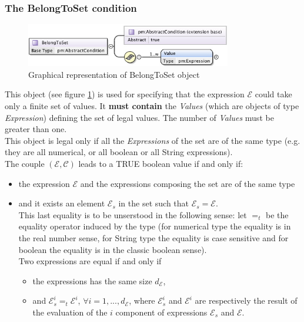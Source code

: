 \documentclass[a4paper,11pt] {article}
\begin{document}
\subsubsection{The BelongToSet condition}\label{par-BelongToSet}
\begin{figure}[htbp]
\begin{center}
\includegraphics[width=0.8\textwidth]{pictures/BelongToSet.jpg} 
\caption{Graphical representation of BelongToSet object}
\label{Pic-BelongToSet}
\end{center}
\end{figure}
This object (see figure \ref{Pic-BelongToSet}) is used for specifying that the expression $\mathcal
E$ could take only a finite set of values.
It {\bf must contain} the {\it Values} (which are objects of type {\it Expression}) defining the set
of legal values. The number of {\it Values} must be greater than one.\\
This object is legal only if all the {\it Expressions} of the set are of the same type (e.g. they
are all numerical, or all boolean or all String expressions).\\
The couple $(\mathcal E, \mathcal C)$ leads to a TRUE boolean value if and only if:
\begin{itemize}
\item the expression $\mathcal E$ and the expressions composing the set are of the same type
\item and it exists an element $\mathcal E_s$ in the set such that $\mathcal E_s = \mathcal E$.\\
This last equality is to be unserstood in the following sense: let $=_t$ be the equality operator
induced by the type (for numerical type the equality is in the real number sense, for String type
the equality is case sensitive and for boolean the equality is in the classic boolean sense).\\
Two expressions are equal if and only if
\begin{itemize}
\item the expressions has the same size $d_{\mathcal E}$,
\item and $\mathcal E_s^i =_t \mathcal E^i$, $\forall i =1,...,d_{\mathcal E}$, where $\mathcal
E_s^i$ and $ \mathcal E^i$ are respectively the result of the evaluation of the
$i$ component of expressions $\mathcal E_s$ and $\mathcal E$. 
\end{itemize}
\end{itemize}
\end{document}
